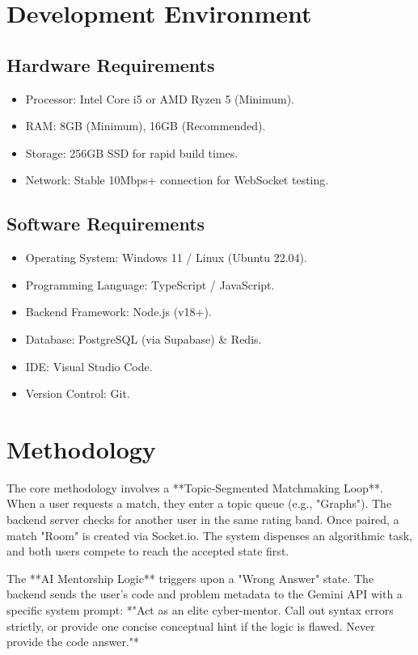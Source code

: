 \documentclass[12pt,a4paper]{report}
\begin{document}
\section{Development Environment}
\subsection{Hardware Requirements}
\begin{itemize}
    \item Processor: Intel Core i5 or AMD Ryzen 5 (Minimum).
    \item RAM: 8GB (Minimum), 16GB (Recommended).
    \item Storage: 256GB SSD for rapid build times.
    \item Network: Stable 10Mbps+ connection for WebSocket testing.
\end{itemize}

\subsection{Software Requirements}
\begin{itemize}
    \item Operating System: Windows 11 / Linux (Ubuntu 22.04).
    \item Programming Language: TypeScript / JavaScript.
    \item Backend Framework: Node.js (v18+).
    \item Database: PostgreSQL (via Supabase) & Redis.
    \item IDE: Visual Studio Code.
    \item Version Control: Git.
\end{itemize}

\section{Methodology}
The core methodology involves a **Topic-Segmented Matchmaking Loop**. When a user requests a match, they enter a topic queue (e.g., "Graphs"). The backend server checks for another user in the same rating band. Once paired, a match "Room" is created via Socket.io. The system dispenses an algorithmic task, and both users compete to reach the accepted state first.

The **AI Mentorship Logic** triggers upon a "Wrong Answer" state. The backend sends the user's code and problem metadata to the Gemini API with a specific system prompt: *"Act as an elite cyber-mentor. Call out syntax errors strictly, or provide one concise conceptual hint if the logic is flawed. Never provide the code answer."*
\end{document}
